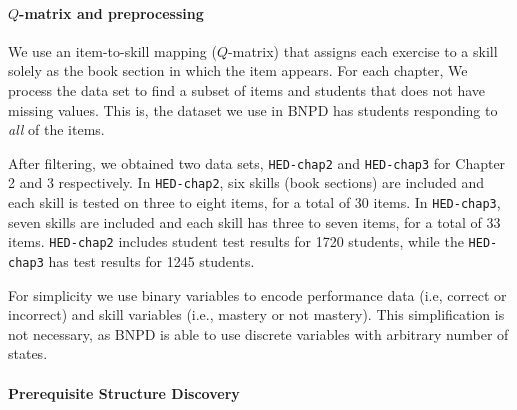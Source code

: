 \documentclass{edm_template}
\newcommand{\hl}[1]{\colorbox{yellow}{#1}}
\begin{document}
{	%
	
	\paragraph{$Q$-matrix and preprocessing}
	\label{sec:preprocessing}
	We use an item-to-skill mapping ($Q$-matrix) that assigns each exercise to a skill solely as the book section in which the item appears.
	For each chapter, We process the data set to find a subset of  items and students that does not have missing values.
	This is,  the dataset we use in BNPD has students responding to \textit{all} of the  items.
	
	After filtering, we obtained two data sets, \texttt{HED-chap2} and \texttt{HED-chap3} for Chapter 2 and 3 respectively.  
	In \texttt{HED-chap2}, six skills (book sections) are included and each skill is tested on three to eight items, for a total of 30  items.
	In \texttt{HED-chap3}, seven skills are included and each skill has three to seven items, for a total of 33 items.
	\texttt{HED-chap2} includes student test results for 1720 students, 
	while the \texttt{HED-chap3} has test results for 1245 students.
	
	For simplicity we use binary variables to encode  performance data (i.e, correct or incorrect) and skill variables  (i.e., mastery or not mastery).
	This simplification is not necessary,  as BNPD is able to use  discrete variables with arbitrary number of states.
	
	\paragraph{Prerequisite Structure Discovery}
	\label{sec:prerequisite_results}
	
}
\end{document}
